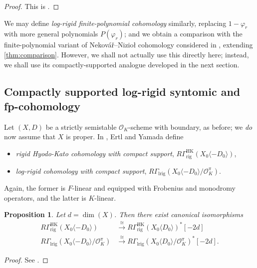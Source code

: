 \documentclass[cjm]{ipart}
\theoremstyle{plain}
\newtheorem{proposition}[theorem]{Proposition}
\theoremstyle{remark}
\DeclareMathOperator{\HK}{HK}
\DeclareMathOperator{\lrig}{lrig}
\newcommand{\Nek}{Nekov\'a\v{r}\xspace}
\newcommand{\Niz}{Nizio\l\xspace}
\newcommand{\cO}{\mathcal{O}}
\newcommand{\rig}{\mathrm{rig}}
\numberwithin{equation}{subsection}
\begin{document}
  \begin{proof}
   This is \cite[Corollary 4.2]{ertlyamada18}.
  \end{proof}

  \begin{note}
   We may define \emph{log-rigid finite-polynomial cohomology} similarly, replacing $1-\varphi_r$ with more general polynomials $P(\varphi_r)$; and we obtain a comparison with the finite-polynomial variant of \Nek--\Niz cohomology considered in \cite{besserloefflerzerbes16}, extending \cref{thm:comparison}. However, we shall not actually use this directly here; instead, we shall use its compactly-supported analogue developed in the next section.
  \end{note}


 \subsection{Compactly supported log-rigid syntomic and fp-cohomology}

  Let $(X, D)$ be a strictly semistable $\cO_K$-scheme with boundary, as before; we \emph{do} now assume that $X$ is proper. In \cite{ertlyamada19}, Ertl and Yamada define
  \begin{itemize}
   \item \emph{rigid Hyodo-Kato cohomology with compact support}, $R\Gamma^{\HK}_{\rig}(X_0 \langle -D_0\rangle)$,
   \item \emph{log-rigid cohomology with compact support},  $R\Gamma_{\lrig}(X_0 \langle -D_0\rangle / \cO_K^\pi)$.
  \end{itemize}
  Again, the former is $F$-linear and equipped with Frobenius and monodromy operators, and the latter is $K$-linear.

  \begin{proposition}
   Let $d=\dim(X)$. Then there exist canonical isomorphisms
   \begin{align}
    R\Gamma^{\HK}_{\rig}(X_0 \langle - D_0\rangle) & \xrightarrow{\cong} R\Gamma^{\HK}_{\rig}(X_0 \langle D_0\rangle)^*[-2d]\label{eq:HKduality}\\
    R\Gamma_{\lrig}(X_0 \langle -D_0\rangle / \cO_K^\pi) & \xrightarrow{\cong} R\Gamma_{\lrig}(X_0 \langle D_0\rangle / \cO_K^\pi)^*[-2d].
   \end{align}
  \end{proposition}

  \begin{proof}
   See \cite[Theorem 6.1]{ertlyamada19}.
  \end{proof}
\end{document}
